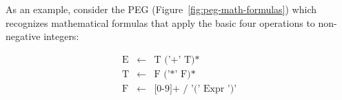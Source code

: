 \begin{example}
   As an example, consider the PEG (Figure~\ref{fig:peg-math-formulas}) which 
   recognizes mathematical formulas that apply the basic four operations to 
   non-negative integers:
   
   \begin{figure*}[ht]
      \[
         \begin{array}{lcl}
            \text{E}   & \leftarrow & \text{T ('+' T)*} \\
            \text{T}  & \leftarrow & \text{F ('*' F)*} \\
            \text{F} & \leftarrow & \text{[0-9]+ / '(' Expr ')'} \\
         \end{array}
      \] 
      \centering
      \caption{PEG for mathematical formulas.}   
      \label{fig:peg-math-formulas}
   \end{figure*}


\end{example}

